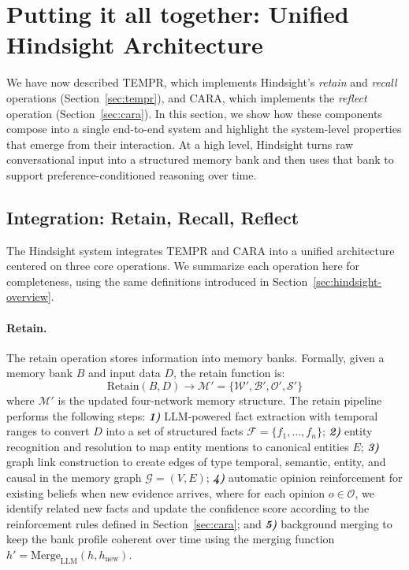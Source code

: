 \section{Putting it all together: Unified Hindsight Architecture}
\label{sec:hindsight-architecture}

We have now described TEMPR, which implements Hindsight's \emph{retain} and \emph{recall} operations (Section~\ref{sec:tempr}), and CARA, which implements the \emph{reflect} operation (Section~\ref{sec:cara}). In this section, we show how these components compose into a single end-to-end system and highlight the system-level properties that emerge from their interaction. At a high level, Hindsight turns raw conversational input into a structured memory bank and then uses that bank to support preference-conditioned reasoning over time.

\subsection{Integration: Retain, Recall, Reflect}

The Hindsight system integrates TEMPR and CARA into a unified architecture centered on three core operations. We summarize each operation here for completeness, using the same definitions introduced in Section~\ref{sec:hindsight-overview}.

\paragraph{Retain.}

The retain operation stores information into memory banks. Formally, given a memory bank $B$ and input data $D$, the retain function is:
\begin{equation}
\text{Retain}(B, D) \rightarrow \mathcal{M}' = \{\mathcal{W}', \mathcal{B}', \mathcal{O}', \mathcal{S}'\}
\end{equation}
where $\mathcal{M}'$ is the updated four-network memory structure. The retain pipeline performs the following steps: \textbf{\textit{1)}} LLM-powered fact extraction with temporal ranges to convert $D$ into a set of structured facts $\mathcal{F} = \{f_1, \ldots, f_n\}$; \textbf{\textit{2)}} entity recognition and resolution to map entity mentions to canonical entities $E$; \textbf{\textit{3)}} graph link construction to create edges of type temporal, semantic, entity, and causal in the memory graph $\mathcal{G} = (V, E)$; \textbf{\textit{4)}} automatic opinion reinforcement for existing beliefs when new evidence arrives, where for each opinion $o \in \mathcal{O}$, we identify related new facts and update the confidence score according to the reinforcement rules defined in Section~\ref{sec:cara}; and \textbf{\textit{5)}} background merging to keep the bank profile coherent over time using the merging function $h' = \text{Merge}_{\text{LLM}}(h, h_{\text{new}})$.

